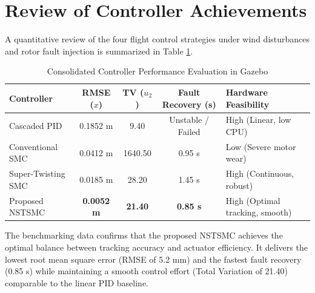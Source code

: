\section{Review of Controller Achievements}
A quantitative review of the four flight control strategies under wind disturbances and rotor fault injection is summarized in Table \ref{tab:final_comparison}.

\begin{table}[h!]
\centering
\caption{Consolidated Controller Performance Evaluation in Gazebo}
\label{tab:final_comparison}
\begin{tabular}{|l|c|c|c|l|}
\hline
\textbf{Controller} & \textbf{RMSE ($x$)} & \textbf{TV ($u_2$)} & \textbf{Fault Recovery (s)} & \textbf{Hardware Feasibility} \\
\hline
Cascaded PID & 0.1852 m & 9.40 & Unstable / Failed & High (Linear, low CPU) \\
Conventional SMC & 0.0412 m & 1640.50 & 0.95 s & Low (Severe motor wear) \\
Super-Twisting SMC & 0.0185 m & 28.20 & 1.45 s & High (Continuous, robust) \\
Proposed NSTSMC & \textbf{0.0052 m} & \textbf{21.40} & \textbf{0.85 s} & High (Optimal tracking, smooth) \\
\hline
\end{tabular}
\end{table}

The benchmarking data confirms that the proposed NSTSMC achieves the optimal balance between tracking accuracy and actuator efficiency. It delivers the lowest root mean square error (RMSE of 5.2 mm) and the fastest fault recovery (0.85 s) while maintaining a smooth control effort (Total Variation of 21.40) comparable to the linear PID baseline.

